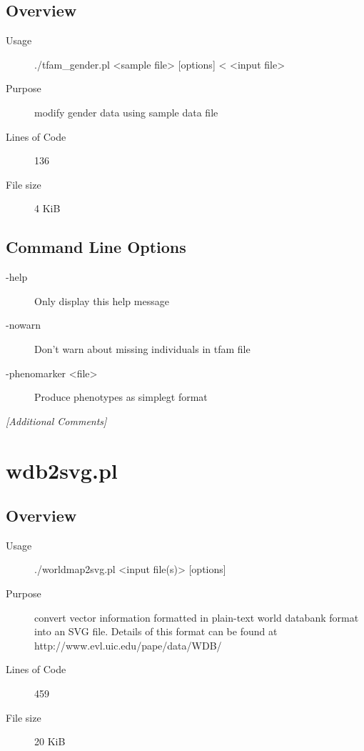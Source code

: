 \subsection{Overview}
\label{sec:tfam-gender.pl-overview}

\begin{description}
\item[Usage] ./tfam_gender.pl <sample file> [options] < <input file>
\item[Purpose] modify gender data using sample data file
\item[Lines of Code] 136
\item[File size] 4 KiB
\end{description}

\subsection{Command Line Options}
\label{sec:tfam-gender.pl-command-line}

\begin{description}
\item[-help] Only display this help message
\item[-nowarn] Don't warn about missing individuals in tfam file
\item[-phenomarker <file>] Produce phenotypes as simplegt format
\end{description}

\emph{[Additional Comments]}

\section{wdb2svg.pl}
\label{sec:wdb2svg.pl}

\subsection{Overview}
\label{sec:wdb2svg.pl-overview}

\begin{description}
\item[Usage] ./worldmap2svg.pl <input file(s)> [options]
\item[Purpose] convert vector information formatted in plain-text world databank format into an SVG file. Details of this format can be found at http://www.evl.uic.edu/pape/data/WDB/
\item[Lines of Code] 459
\item[File size] 20 KiB
\end{description}

